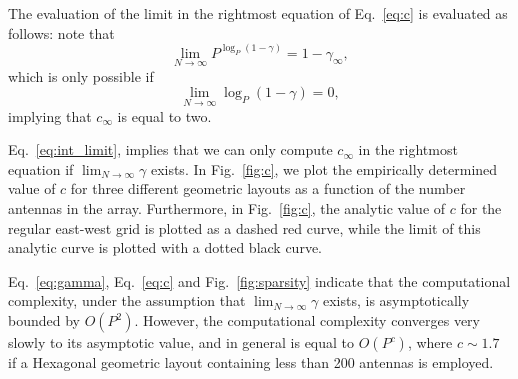 \documentclass[useAMS,usenatbib]{mn2e}
\begin{document}
The evaluation of the limit in the rightmost equation of Eq.~\eqref{eq:c} is evaluated as follows: note that
\begin{equation}
\label{eq:int_limit}
\lim_{N\rightarrow\infty} P^{\log_{P}(1-\gamma)} = 1-\gamma_{\infty},
\end{equation}
which is only possible if 
\begin{equation}
\lim_{N\rightarrow\infty} \log_{P}(1-\gamma) = 0,
\end{equation}
implying that $c_{\infty}$ is equal to two.

Eq.~\eqref{eq:int_limit}, implies that we can only compute $c_{\infty}$ in the rightmost equation if $\lim_{N\rightarrow \infty} \gamma$ exists. 
In Fig.~\ref{fig:c}, we plot the empirically determined value of $c$ for three different geometric layouts as a function of the number antennas in the array.
Furthermore, in Fig.~\ref{fig:c}, the analytic value of $c$ for the regular east-west grid is plotted as a dashed red curve, while the limit of this analytic curve is plotted with a dotted black curve. 

Eq.~\eqref{eq:gamma}, Eq.~\eqref{eq:c} and Fig.~\ref{fig:sparsity} indicate that the computational complexity, under the assumption that $\lim_{N\rightarrow \infty} \gamma$ exists, is asymptotically bounded by $O(P^2)$.
However, the computational complexity converges very slowly to its asymptotic value, and in general is equal to $O(P^{c})$, where $c \sim 1.7$ if a Hexagonal geometric layout containing less than 200 antennas is employed.
\end{document}
